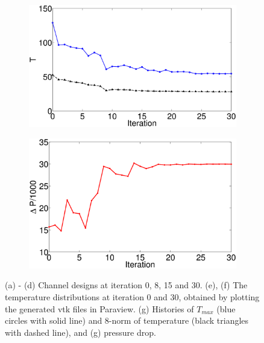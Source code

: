 \documentclass[11pt,letterpaper]{article}
\begin{document}
\begin{figure}[!h]
\centering
\begin{subfigure}{0.45\textwidth}
\includegraphics[width=\linewidth]{parallelTwo_Pmax30k_history.eps}
\caption{}
\end{subfigure}
\begin{subfigure}{0.4\textwidth}
\includegraphics[width=\linewidth]{parallelTwo_Pmax30k_pressure_history.eps}
\caption{ }
\end{subfigure}

\caption{(a) - (d) Channel designs at iteration 0, 8, 15 and 30. (e), (f) The temperature distributions at iteration 0 and 30, obtained by plotting the generated vtk files in Paraview. (g) Histories of $T_{max}$ (blue circles with solid line) and 8-norm of temperature (black triangles with dashed line), and (g) pressure drop. }
\end{figure}

 
 \FloatBarrier
\end{document}
